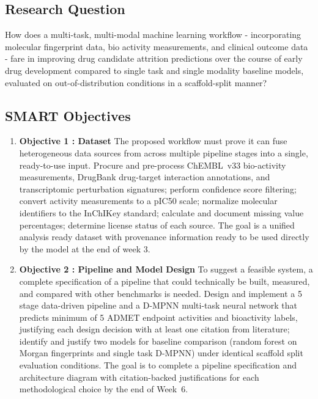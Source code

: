 \documentclass[conference]{IEEEtran}
\begin{document}
\subsection{Research Question}
How does a multi-task, multi-modal machine learning workflow - incorporating molecular fingerprint data, bio activity measurements, and clinical outcome data - fare in improving drug candidate attrition predictions over the course of early drug development compared to single task and single modality baseline models, evaluated on out-of-distribution conditions in a scaffold-split manner?

\subsection{SMART Objectives}
 
\begin{enumerate}
 
\item \textbf{Objective 1 : Dataset} The proposed workflow must prove it can fuse heterogeneous data sources from across multiple pipeline stages into a single, ready-to-use input. Procure and pre-process ChEMBL~v33 bio-activity measurements, DrugBank drug-target interaction annotations, and transcriptomic perturbation signatures; perform confidence score filtering; convert activity measurements to a pIC50 scale; normalize molecular identifiers to the InChIKey standard; calculate and document missing value percentages; determine license status of each source. The goal is a unified analysis ready dataset with provenance information ready to be used directly by the model at the end of week 3.
 
\item \textbf{Objective 2 : Pipeline and Model Design} To suggest a feasible system, a complete specification of a pipeline that could technically be built, measured, and compared with other benchmarks is needed. Design and implement a 5 stage data-driven pipeline and a D-MPNN multi-task neural network that predicts minimum of 5 ADMET endpoint activities and bioactivity labels, justifying each design decision with at least one citation from literature; identify and justify two models for baseline comparison (random forest on Morgan fingerprints and single task D-MPNN) under identical scaffold split evaluation conditions. The goal is to complete a pipeline specification and architecture diagram with citation-backed justifications for each methodological choice by the end of Week~6.
 

\end{enumerate}
\end{document}
